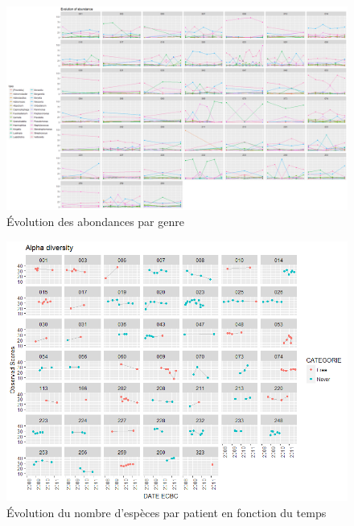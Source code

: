 \documentclass[12pt,a4paper]{article}
\begin{document}
\begin{figure}
\begin{center}
\includegraphics[scale=0.50,angle=90]{img/evolution_abundance.png}\hfill
\end{center}
\caption{Évolution des abondances par genre}
\label{plotabundancecurve}
\end{figure}


\begin{figure}
\begin{center}
\includegraphics[scale=0.80]{img/alpha_observed.png}\hfill
\end{center}
\caption{Évolution du nombre d'espèces par patient en fonction du temps}
\label{alphaObs}
\end{figure}
\end{document}
